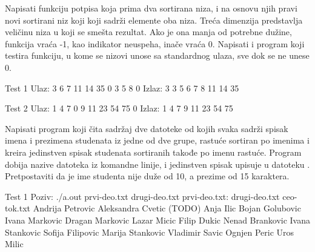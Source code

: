 \begin{Exercise}[label=505]
  Napisati funkciju potpisa  koja prima dva sortirana
  niza, i na osnovu njih pravi novi sortirani niz koji koji sadrži
  elemente oba niza. Treća dimenzija predstavlja veličinu niza u koji
  se smešta rezultat. Ako je ona manja od potrebne dužine, funkcija
  vraća -1, kao indikator neuspeha, inače vraća 0. Napisati i program
  koji testira funkciju, u kome se nizovi unose sa standardnog ulaza,
  sve dok se ne unese 0.
  
\begin{miditest}
\begin{test}{Test 1}
Ulaz:   3 6 7 11 14 35 0 3 5 8 0
Izlaz:  3 3 5 6 7 8 11 14 35
\end{test}
\end{miditest}

\begin{miditest}
\begin{test}{Test 2}
Ulaz:   1 4 7 0 9 11 23 54 75 0
Izlaz:  1 4 7 9 11 23 54 75
\end{test}
\end{miditest}
  
\end{Exercise}

\begin{Exercise}[label=506]
  Napisati program koji čita sadržaj dve datoteke od kojih svaka
  sadrži spisak imena i prezimena studenata iz jedne od dve grupe,
  rastuće sortiran po imenima i kreira jedinstven spisak studenata
  sortiranih takođe po imenu rastuće.  Program dobija nazive datoteka
  iz komandne linije, i jedinstven spisak upisuje u datoteku
  . Pretpostaviti da je ime studenta nije duže od
  10, a prezime od 15 karaktera.


\begin{maxitest}
\begin{test}{Test 1}
Poziv: ./a.out prvi-deo.txt drugi-deo.txt
prvi-deo.txt:          drugi-deo.txt          ceo-tok.txt
Andrija Petrovic       Aleksandra Cvetic      (TODO)
Anja Ilic              Bojan Golubovic
Ivana Markovic         Dragan Markovic
Lazar Micic            Filip Dukic
Nenad Brankovic        Ivana Stankovic
Sofija Filipovic       Marija Stankovic
Vladimir Savic         Ognjen Peric
                       Uros Milic
\end{test}
\end{maxitest}
  
\end{Exercise}

